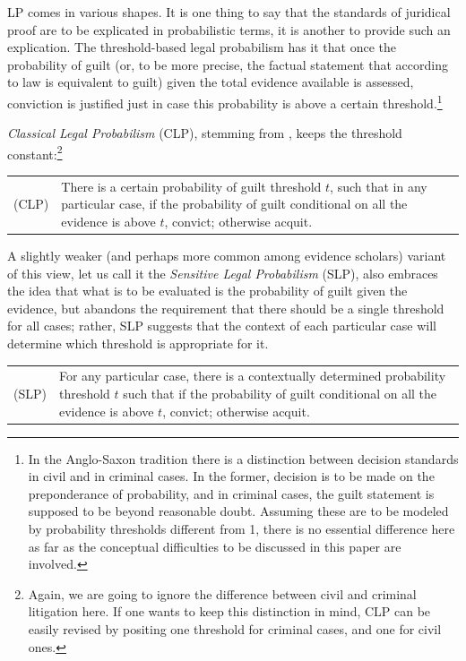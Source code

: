 \documentclass{ifcolog}
\begin{document}
LP comes in various shapes. It is one thing to say that the standards of juridical proof are to be explicated in probabilistic terms, it is another to provide such an explication. The threshold-based legal probabilism has it that once the probability of guilt (or, to be more precise, the factual statement that according to law is equivalent to guilt) given the total evidence available is assessed, conviction is justified just in case this probability is above a certain threshold.\footnote{In the Anglo-Saxon tradition there is a distinction between decision standards in civil and in criminal cases. In the former,  decision is to be made on the preponderance of probability, and in criminal cases, the guilt statement is supposed to be beyond reasonable doubt. Assuming these are to be modeled by probability thresholds different from 1, there is no essential difference here as far as the conceptual difficulties to be discussed in this paper are involved.}

  \emph{Classical Legal Probabilism} (CLP), stemming from   \citep{Bernoulli1713Ars-conjectandi}, keeps the threshold constant:\footnote{Again, we are going to ignore the difference between civil and criminal litigation here. If one wants to keep this distinction in mind, CLP can be easily revised by positing one threshold for criminal cases, and one for civil ones. }

\begin{center}
\begin{tabular}{lp{11.5cm}}
{(CLP)} & There is a certain probability of guilt threshold $t$, such that in any particular case, if the probability of guilt conditional on all the evidence is above $t$, convict; otherwise acquit.\end{tabular}
 \end{center}



A slightly weaker (and  perhaps more common among evidence scholars)  variant of this view, let us call it the \emph{Sensitive Legal Probabilism} (SLP), also embraces the idea that what is to be evaluated is the probability of guilt given the evidence, but abandons the requirement that there should be a single threshold for all cases; rather, SLP suggests that the context of each particular case will determine which threshold is appropriate for it. 

\begin{center}
\begin{tabular}{lp{11.5cm}}
{(SLP)} & For  any particular case, there is a contextually determined probability threshold $t$ such that if the probability of guilt conditional on all the evidence is above $t$, convict; otherwise acquit.\end{tabular}
 \end{center}
\end{document}
